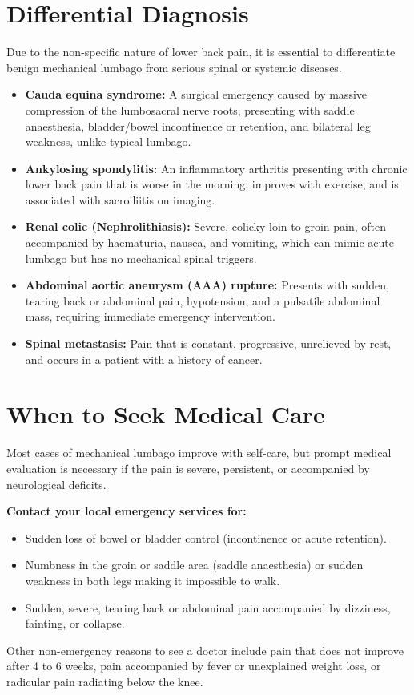 \section*{Differential Diagnosis}
Due to the non-specific nature of lower back pain, it is essential to differentiate benign mechanical lumbago from serious spinal or systemic diseases.
\begin{itemize}
    \item \textbf{Cauda equina syndrome:} A surgical emergency caused by massive compression of the lumbosacral nerve roots, presenting with saddle anaesthesia, bladder/bowel incontinence or retention, and bilateral leg weakness, unlike typical lumbago.
    \item \textbf{Ankylosing spondylitis:} An inflammatory arthritis presenting with chronic lower back pain that is worse in the morning, improves with exercise, and is associated with sacroiliitis on imaging.
    \item \textbf{Renal colic (Nephrolithiasis):} Severe, colicky loin-to-groin pain, often accompanied by haematuria, nausea, and vomiting, which can mimic acute lumbago but has no mechanical spinal triggers.
    \item \textbf{Abdominal aortic aneurysm (AAA) rupture:} Presents with sudden, tearing back or abdominal pain, hypotension, and a pulsatile abdominal mass, requiring immediate emergency intervention.
    \item \textbf{Spinal metastasis:} Pain that is constant, progressive, unrelieved by rest, and occurs in a patient with a history of cancer.
\end{itemize}

\section*{When to Seek Medical Care}
Most cases of mechanical lumbago improve with self-care, but prompt medical evaluation is necessary if the pain is severe, persistent, or accompanied by neurological deficits.

\textbf{Contact your local emergency services for:}
\begin{itemize}
    \item Sudden loss of bowel or bladder control (incontinence or acute retention).
    \item Numbness in the groin or saddle area (saddle anaesthesia) or sudden weakness in both legs making it impossible to walk.
    \item Sudden, severe, tearing back or abdominal pain accompanied by dizziness, fainting, or collapse.
\end{itemize}
Other non-emergency reasons to see a doctor include pain that does not improve after 4 to 6 weeks, pain accompanied by fever or unexplained weight loss, or radicular pain radiating below the knee.

